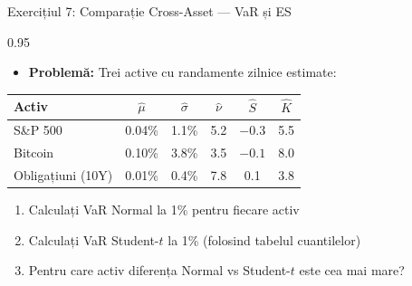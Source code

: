 \documentclass[9pt, aspectratio=169, t]{beamer}
\begin{document}
\begin{frame}{Exercițiul 7: Comparație Cross-Asset --- VaR și ES}
\begin{cminipage}{0.95\textwidth}
    \begin{itemize}\setlength{\itemsep}{0pt}
        \item \textbf{Problemă:} Trei active cu randamente zilnice estimate:
    \end{itemize}
    \vspace{0.1cm}
    \small
    \renewcommand{\arraystretch}{1.2}
    \begin{tabular}{lccccc}
    \toprule
    \textbf{Activ} & $\hat{\mu}$ & $\hat{\sigma}$ & $\hat{\nu}$ & $\hat{S}$ & $\hat{K}$ \\
    \midrule
    S\&P 500 & 0.04\% & 1.1\% & 5.2 & $-0.3$ & 5.5 \\
    Bitcoin & 0.10\% & 3.8\% & 3.5 & $-0.1$ & 8.0 \\
    Obligațiuni (10Y) & 0.01\% & 0.4\% & 7.8 & 0.1 & 3.8 \\
    \bottomrule
    \end{tabular}
    \normalsize
    \vspace{0.1cm}
    \begin{enumerate}\setlength{\itemsep}{0pt}
        \item Calculați VaR Normal la 1\% pentru fiecare activ
        \item Calculați VaR Student-$t$ la 1\% (folosind tabelul cuantilelor)
        \item Pentru care activ diferența Normal vs Student-$t$ este cea mai mare?
    \end{enumerate}
\end{cminipage}
\end{frame}
\end{document}

